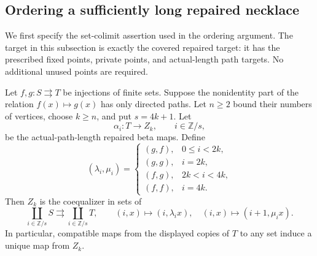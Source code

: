 \subsection{Ordering a sufficiently long repaired necklace}

We first specify the set-colimit assertion used in the ordering argument.
The target in this subsection is exactly the covered repaired target:
it has the prescribed fixed points, private points, and actual-length
path targets. No additional unused points are required.

\begin{lemma}
\label{C:necklace-set-colimit}
Let $f,g:S\rightrightarrows T$ be injections of finite sets. Suppose
the nonidentity part of the relation $f(x)\mapsto g(x)$ has only directed
paths. Let $n\geq2$ bound their numbers of vertices, choose $k\geq n$,
and put $s=4k+1$. Let
\[
 \alpha_i:T\longrightarrow Z_k,\qquad i\in\mathbb Z/s,
\]
be the actual-path-length repaired beta maps. Define
\[
 (\lambda_i,\mu_i)=
 \begin{cases}
 (g,f),&0\leq i<2k,\\
 (g,g),&i=2k,\\
 (f,g),&2k<i<4k,\\
 (f,f),&i=4k.
 \end{cases}
\]
Then $Z_k$ is the coequalizer in sets of
\[
 \coprod_{i\in\mathbb Z/s}S
 \rightrightarrows
 \coprod_{i\in\mathbb Z/s}T,
 \qquad
 (i,x)\longmapsto(i,\lambda_i x),\quad
 (i,x)\longmapsto(i+1,\mu_i x).
 \tag{NC}\label{eq:akr-necklace-coequalizer}
\]
In particular, compatible maps from the displayed copies of $T$ to
any set induce a unique map from $Z_k$.
\end{lemma}
